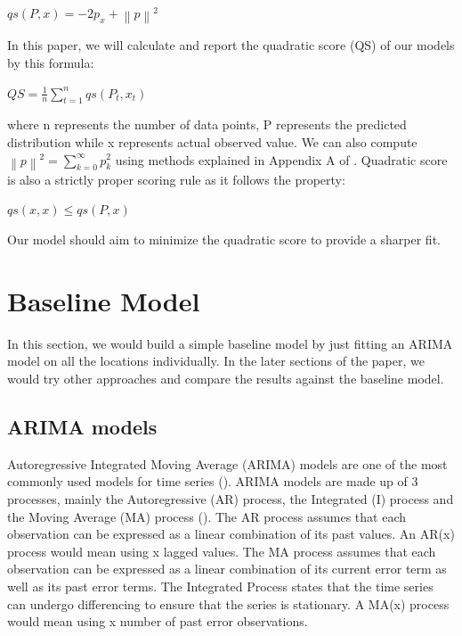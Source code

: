 \documentclass[nonblindrev,msom]{informs3} %
\begin{document}
\begin{center}
    $\displaystyle qs(P, x) = -2p_{x} + \left \| p \right \|^{2}$
\end{center}


\noindent In this paper, we will calculate and report the quadratic score (QS) of our models by this formula:

\begin{center}
    $\displaystyle QS=\frac{1}{n}\sum_{t=1}^{n}qs(P_t,x_t)$
\end{center}

\noindent where n represents the number of data points, P represents the predicted distribution while x represents actual observed value. We can also compute $\left \| p \right \|^{2} = \sum_{k=0}^{\infty }p_{k}^{2}$ using methods explained in Appendix A of \cite{Czado2009PredictiveMA}. Quadratic score is also a strictly proper scoring rule as it follows the property:

\begin{center}
    $\displaystyle qs(x, x) \leq qs(P, x)$
\end{center}

\noindent Our model should aim to minimize the quadratic score to provide a sharper fit.

\newpage
\section{Baseline Model}
In this section, we would build a simple baseline model by just fitting an ARIMA model on all the locations individually. In the later sections of the paper, we would try other approaches and compare the results against the baseline model. 



\subsection{ARIMA models}
Autoregressive Integrated Moving Average (ARIMA) models are one of the most commonly used models for time series (\cite{Asha2016}). ARIMA models are made up of 3 processes, mainly the Autoregressive (AR) process, the Integrated (I) process and the Moving Average (MA) process (\cite{Jamal2018}). The AR process assumes that each observation can be expressed as a linear combination of its past values.  An AR(x) process would mean using x lagged values. The MA process assumes that each observation can be expressed as a linear combination of its current error term as well as its past error terms. The Integrated Process states that the time series can undergo differencing to ensure that the series is stationary. A MA(x) process would mean using x number of past error observations. \\
\end{document}
